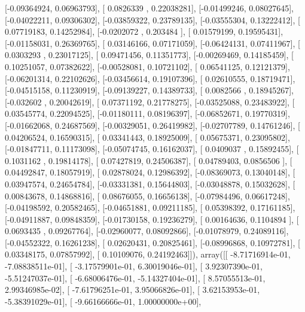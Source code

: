 \documentclass{article}
\begin{document}
       [-0.09364924,  0.06963793],
       [ 0.0826339 ,  0.22038281],
       [-0.01499246,  0.08027645],
       [-0.04022211,  0.09306302],
       [-0.03859322,  0.23789135],
       [-0.03555304,  0.13222412],
       [ 0.07719183,  0.14252984],
       [-0.0202072 ,  0.203484  ],
       [ 0.01579199,  0.19595431],
       [-0.01158031,  0.26369765],
       [ 0.03146166,  0.07171059],
       [-0.06424131,  0.07411967],
       [ 0.0303293 ,  0.23017125],
       [ 0.09471456,  0.11351773],
       [-0.00269469,  0.14185459],
       [ 0.10251057,  0.07382622],
       [-0.00528081,  0.10721102],
       [ 0.06541125,  0.12121379],
       [-0.06201314,  0.22102626],
       [-0.03456614,  0.19107396],
       [ 0.02610555,  0.18719471],
       [-0.04515158,  0.11230919],
       [-0.09139227,  0.14389733],
       [ 0.0082566 ,  0.18945267],
       [-0.032602  ,  0.20042619],
       [ 0.07371192,  0.21778275],
       [-0.03525088,  0.23483922],
       [ 0.03545774,  0.22094525],
       [-0.01180111,  0.08196397],
       [-0.06852671,  0.19770319],
       [-0.01662068,  0.24687569],
       [-0.00329051,  0.26419982],
       [-0.02707789,  0.14761246],
       [ 0.04206524,  0.16590315],
       [ 0.03341443,  0.18925009],
       [ 0.05675371,  0.23095802],
       [-0.01847711,  0.11173098],
       [-0.05074745,  0.16162037],
       [ 0.0409037 ,  0.15892455],
       [ 0.1031162 ,  0.19814178],
       [ 0.07427819,  0.24506387],
       [ 0.04789403,  0.0856506 ],
       [ 0.04492847,  0.18057919],
       [ 0.02878024,  0.12986392],
       [-0.08369073,  0.13040148],
       [ 0.03947574,  0.24654784],
       [-0.03331381,  0.15644803],
       [-0.03048878,  0.15032628],
       [ 0.00843678,  0.14868816],
       [ 0.08676055,  0.16656138],
       [-0.07984496,  0.06617248],
       [-0.04198592,  0.20582465],
       [-0.04651881,  0.09211185],
       [ 0.05398392,  0.17161185],
       [-0.04911887,  0.09848359],
       [-0.01730158,  0.19236279],
       [ 0.00164636,  0.1104894 ],
       [ 0.0693435 ,  0.09267764],
       [-0.02960077,  0.08092866],
       [-0.01078979,  0.24089116],
       [-0.04552322,  0.16261238],
       [ 0.02620431,  0.20825461],
       [-0.08996868,  0.10972781],
       [ 0.03348175,  0.07857992],
       [ 0.10109076,  0.24192463]]), array([[ -8.71716914e-01,  -7.08838511e-01],
       [ -3.17579901e-01,   6.30019046e-01],
       [  3.92307390e-01,  -5.51247037e-01],
       [ -6.68006476e-01,  -5.14327404e-01],
       [  8.57055513e-01,   2.99346985e-02],
       [ -7.61796251e-01,   3.95066826e-01],
       [  3.62153953e-01,  -5.38391029e-01],
       [ -9.66166666e-01,   1.00000000e+00],
\end{document}
